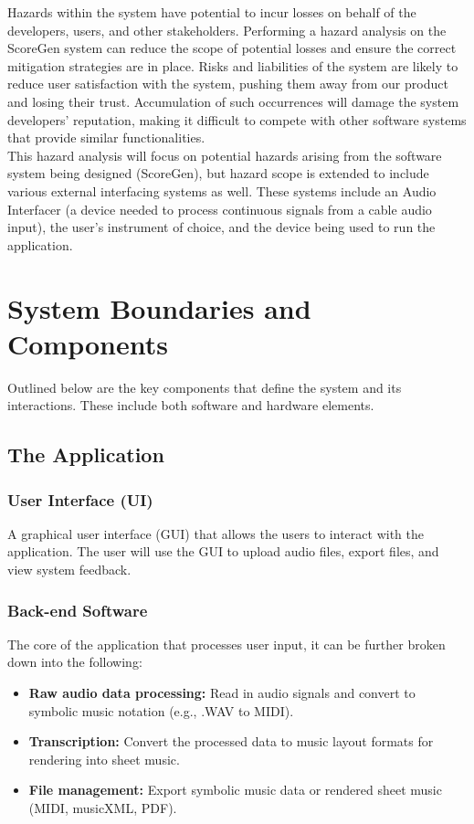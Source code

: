 \documentclass{article}
\begin{document}
Hazards within the system have potential to incur losses on behalf of the developers, users, and other stakeholders. 
Performing a hazard analysis on the ScoreGen system can reduce the scope of potential losses and ensure the correct 
mitigation strategies are in place. Risks and liabilities of the system are likely to reduce user satisfaction with 
the system, pushing them away from our product and losing their trust. Accumulation of such occurrences will damage 
the system developers’ reputation, making it difficult to compete with other software systems that provide similar 
functionalities. \\

\noindent
This hazard analysis will focus on potential hazards arising from the software system being designed (ScoreGen), but 
hazard scope is extended to include various external interfacing systems as well. These systems include an Audio 
Interfacer (a device needed to process continuous signals from a cable audio input), the user’s instrument of choice, 
and the device being used to run the application.


\section{System Boundaries and Components}
Outlined below are the key components that define the system and its interactions. These include both software and hardware elements.  
\subsection{The Application}
\subsubsection{User Interface (UI)}
A graphical user interface (GUI) that allows the users to interact with the application. The user will use the GUI to upload audio files, 
export files, and view system feedback.

\subsubsection{Back-end Software}
The core of the application that processes user input, it can be further broken down into the following:
\begin{itemize}
    \item \textbf{Raw audio data processing:} Read in audio signals and convert to symbolic music notation (e.g., .WAV to MIDI).
    \item \textbf{Transcription:} Convert the processed data to music layout formats for rendering into sheet music.
    \item \textbf{File management:} Export symbolic music data or rendered sheet music (MIDI, musicXML, PDF).
\end{itemize}
\end{document}
